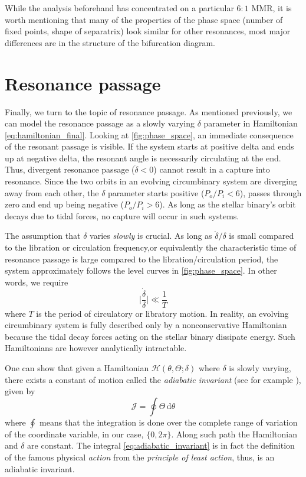\documentclass[ twoside,openright,titlepage,numbers=noenddot,headinclude,%
                footinclude=true,cleardoublepage=empty,abstractoff, %
                BCOR=5mm,paper=a4,fontsize=11pt,%
                american,%
                ]{scrreprt}
\begin{document}
While the analysis beforehand has concentrated on a particular $6:1$ MMR, it is 
worth mentioning 
that many of the properties of the phase space (number of fixed points, shape of
separatrix) look similar for other 
resonances, most major differences are in the structure of the bifurcation diagram.

\section{Resonance passage}
\label{sec:Resonance_passage}
Finally, we turn to the topic of resonance passage. As mentioned previously, we
can model the resonance passage as a slowly varying $\delta$ parameter in Hamiltonian 
\ref{eq:hamiltonian_final}. 
Looking at \cref{fig:phase_space}, an immediate consequence of the resonant
passage is visible. If the system starts at positive delta and ends up at
negative delta, the resonant angle is necessarily circulating at the end. 
Thus, divergent
resonance passage ($\dot{\delta}<0$) cannot result in a capture into resonance.
Since the two orbits in an evolving circumbinary system
are diverging away from each other, the $\delta$ parameter starts positive 
($P_o/P_i<6$), passes through zero and end up being negative ($P_o/P_i>6$).
As long as the stellar binary's orbit decays due to tidal forces, no capture 
will occur in such systems.

The assumption that $\delta$ varies \emph{slowly} is crucial. As long as
$\dot{\delta}/\delta$ is small compared to the libration or circulation 
frequency,or equivalently the characteristic time of resonance passage
is large compared to the libration/circulation period, the system 
approximately follows the level curves in \cref{fig:phase_space}. In 
other words, we require 
\begin{equation}
    \bigg\lvert\frac{\dot{\delta}}{\delta}\bigg\rvert \ll \frac{1}{T} 
    \label{eq:adabatic_criterion}
\end{equation}
where $T$ is the period of circulatory or libratory motion.
In reality, an evolving circumbinary system is fully 
described only by a nonconservative Hamiltonian because the tidal decay
forces acting on the stellar binary dissipate energy. Such Hamiltonians
are however analytically intractable.

One can show that given a Hamiltonian $\mathcal{H}(\theta,\Theta;\delta)$
where $\delta$ is slowly varying, there exists a constant of motion
called the \emph{adiabatic invariant} (see for example \cite{landau}),
given by
\begin{equation}
    \mathcal{J}=\oint \Theta\,\mathrm{d}\theta    
    \label{eq:adiabatic_invariant}
\end{equation}
where $\oint$ means that the integration is done over the complete range
of variation of the coordinate variable, in our case, $\{0,2\pi\}$. Along
such  path the Hamiltonian and $\delta$ are constant. The integral
\ref{eq:adiabatic_invariant} is in fact the definition of the famous
physical \emph{action} from the \emph{principle of least action}, thus, 
is an adiabatic invariant.
\end{document}
